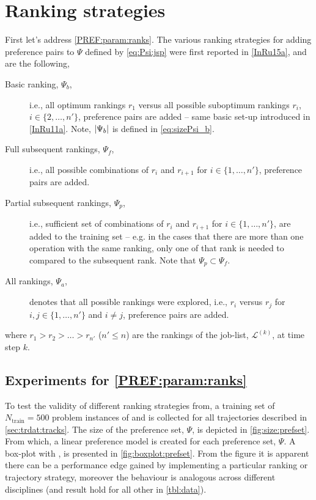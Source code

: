 \section{Ranking strategies}\label{sec:trdat:param:ranks}
First let's address \ref{PREF:param:ranks}. 
The various ranking strategies for adding preference pairs to $\Psi$ defined by 
\cref{eq:Psi:jsp} were first reported in \cref{InRu15a}, and are the following,
\begin{description}
    \item[Basic ranking, $\Psi_b$,] i.e., all optimum rankings $r_1$ versus all 
    possible suboptimum rankings $r_i$, $i\in\{2,\ldots,n'\}$, preference pairs 
    are added -- same basic set-up introduced in \cref{InRu11a}. Note, 
    $\lvert\Psi_b\rvert$ is defined in \cref{eq:sizePsi_b}.
    \item[Full subsequent rankings, $\Psi_f$,] i.e., all possible combinations 
    of $r_i$ and $r_{i+1}$ for $i\in\{1,\ldots,n'\}$, preference pairs are 
    added.
    \item[Partial subsequent rankings, $\Psi_p$,] i.e., sufficient set of 
    combinations of $r_i$ and $r_{i+1}$ for $i\in\{1,\ldots,n'\}$, are added to 
    the training set -- e.g. in the cases that there are more than one 
    operation with the same ranking, only one of that rank is needed to 
    compared to the subsequent rank. Note that $\Psi_p\subset \Psi_f$.
    \item[All rankings, $\Psi_a$,] denotes that all possible rankings were 
    explored, i.e.,
    $r_i$ versus $r_j$ for $i,j\in\{1,\ldots,n'\}$ and $i\neq j$, preference 
    pairs are added.
\end{description}
where $r_1>r_2>\ldots>r_{n'}$ ($n'\leq n$) are the rankings of the job-list, 
$\mathcal{L}^{(k)}$, at time step $k$.

\subsection*{Experiments for \ref{PREF:param:ranks}}
To test the validity of different ranking strategies from, a training set of 
$N_{\text{train}}=500$ problem instances of  and 
is collected for all trajectories described in \cref{sec:trdat:tracks}. 
The size of the preference set, $\Psi$, is depicted in \cref{fig:size:prefset}.
From which, a linear preference model is created for each preference 
set, $\Psi$. A box-plot with \fullnamerho, is presented in 
\cref{fig:boxplot:prefset}. 
From the figure it is apparent there can be a performance edge gained by 
implementing a particular ranking or trajectory strategy, moreover the 
behaviour is analogous across different disciplines (and result hold for 
all other  in \cref{tbl:data}).

